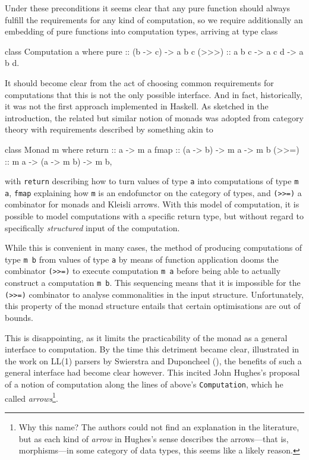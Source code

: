 Under these preconditions it seems clear that any pure function should always
fulfill the requirements for any kind of computation, so we require additionally
an embedding of pure functions into computation types, arriving at type class
\begin{code}
  class Computation a where
      pure   :: (b -> c) -> a b c
      (>>>)  :: a b c -> a c d -> a b d\textrm{.}
\end{code}

It should become clear from the act of choosing common requirements for
computations that this is not the only possible interface. And in fact,
historically, it was not the first approach implemented in Haskell. As sketched
in the introduction, the related but similar notion of monads was adopted from
category theory with requirements described by something akin to
\begin{code}
  class Monad m where
      return :: a -> m a
      fmap   :: (a -> b) -> m a -> m b
      (>>=)  :: m a -> (a -> m b) -> m b\textrm{,}
\end{code}
with \verb|return| describing how to turn values of type \verb|a| into
computations of type \verb|m a|, \verb|fmap| explaining how \verb|m| is an
endofunctor on the category of types, and \verb|(>>=)| a combinator for monads
and Kleisli arrows. With this model of computation, it is possible to model
computations with a specific return type, but without regard to specifically
\emph{structured} input of the computation.

While this is convenient in many cases, the method of producing computations of
type \verb|m b| from values of type \verb|a| by means of function application
dooms the combinator \verb|(>>=)| to execute computation \verb|m a| before being
able to actually construct a computation \verb|m b|. This sequencing means that
it is impossible for the \verb|(>>=)| combinator to analyse commonalities in
the input structure. Unfortunately, this property of the monad structure entails
that certain optimisations are out of bounds.

This is disappointing, as it limits the practicability of the monad as a general
interface to computation. By the time this detriment became clear, illustrated
in the work on LL(1) parsers by Swierstra and Duponcheel (\cite{swierstra}), the
benefits of such a general interface had become clear however. This incited John
Hughes's proposal of a notion of computation along the lines of above's
\verb|Computation|, which he called \emph{arrows}\footnote{Why this name? The
authors could not find an explanation in the literature, but as each kind of
\emph{arrow} in Hughes's sense describes the arrows---that is, morphisms---in
some category of data types, this seems like a likely reason.}.

